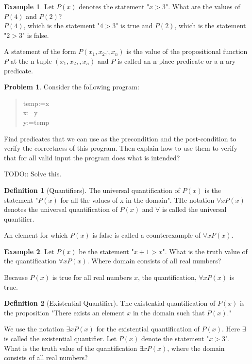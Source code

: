 \documentclass[12pt,oneside,a4paper]{book}
\theoremstyle{remark}
\theoremstyle{definition}
\newtheorem{prob}{Problem}[section]
\newtheorem{defn}{Definition}
\newtheorem*{ex}{Example}
\begin{document}
\begin{ex}
    Let \(P(x)\) denotes the statement "\(x>3\)". What are the values of \(P(4)\) and \(P(2)\)?\\
    \(P(4)\), which is the statement "\(4>3\)" is true and \(P(2)\), which is the statement "\(2>3\)" is false.
\end{ex}
A statement of the form \(P(x_1,x_2,\dot,x_n)\) is the value of the propositional function $ P $ at the n-tuple \((x_1,x_2,\dot,x_n)\) and $ P $ is called an n-place predicate or a n-ary predicate.
\begin{prob}
    Consider the following program:
    \begin{quote}
        temp:=x\\x:=y\\y:=temp
    \end{quote}
    Find predicates that we can use as the precondition and the post-condition to verify the correctness of this program.
    Then explain how to use them to verify that for all valid input the program does what is intended?
\end{prob}
TODO:: Solve this.
\begin{defn}[Quantifiers]
    The universal quantification of \(P(x)\) is the statement "\(P(x)\) for all the values of x in the domain".
    THe notation \(\forall x P(x)\) denotes the universal quantification of \(P(x)\) and \(\forall\) is called the universal quantifier.

    An element for which \(P(x)\) is false is called a counterexample of \(\forall x P(x)\).
\end{defn}
\begin{ex}
    Let \(P(x)\) be the statement "\(x+1>x\)". What is the truth value of the quantification \(\forall x P(x)\). Where domain consists of all real numbers?

    Because \(P(x)\) is true for all real numbers \(x\), the quantification, \(\forall x P(x)\) is true.
\end{ex}
\begin{defn}[Existential Quantifier]
    The existential quantification of \(P(x)\) is the proposition "There exists an element $ x $ in the domain such that \(P(x)\)."

    We use the notation \(\exists xP(x)\) for the existential quantification of \(P(x)\). Here \(\exists\) is called the existential quantifier.
    Let \(P(x)\) denote the statement "\(x>3\)". What is the truth value of the quantification \(\exists xP(x)\), where the domain consists of all real numbers?
\end{defn}
\end{document}
